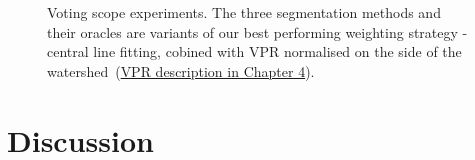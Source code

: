 \begin{figure}[ht!]
\centering
\caption{Voting scope experiments. The three segmentation methods and their oracles are variants of our best performing weighting strategy - central line fitting, cobined with VPR normalised on the side of the watershed~(\hyperref[sec:ch4-VPR-maths]{VPR description in Chapter 4}).}
\label{fig:voting-scope-line-centre-VPR-ws}
\end{figure}

\section{Discussion}

